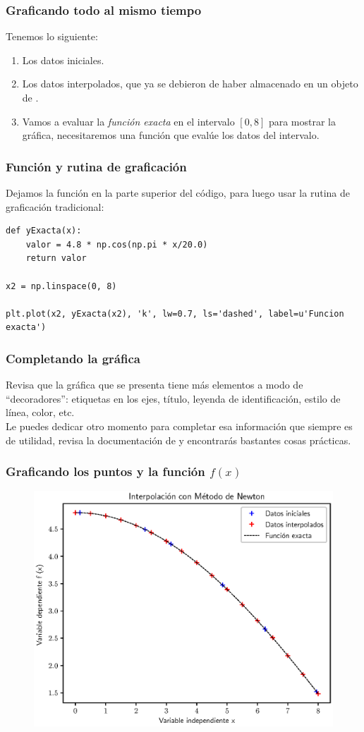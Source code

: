 \documentclass[12pt]{beamer}
\begin{document}
\begin{frame}
\frametitle{Graficando todo al mismo tiempo}
Tenemos lo siguiente:
\begin{enumerate}[<+->]
\item Los datos iniciales.
\item Los datos interpolados, que ya se debieron de haber almacenado en un objeto de \python.
\item Vamos a evaluar la \textit{función exacta} en el intervalo $[0, 8]$ para mostrar la gráfica, necesitaremos una función que evalúe los datos del intervalo.
\end{enumerate}
\end{frame}
\begin{frame}[fragile]
\frametitle{Función y rutina de graficación}
Dejamos la función en la parte superior del código, para luego usar la rutina de graficación tradicional:
\pause
\begin{lstlisting}[caption=Graficando la función exacta, style=FormattedNumber, basicstyle=\linespread{0.9}\ttfamily=\small, columns=fullflexible]
def yExacta(x):
    valor = 4.8 * np.cos(np.pi * x/20.0)
    return valor

x2 = np.linspace(0, 8)

plt.plot(x2, yExacta(x2), 'k', lw=0.7, ls='dashed', label=u'Funcion exacta')
\end{lstlisting}
\end{frame}
\begin{frame}
\frametitle{Completando la gráfica}
Revisa que la gráfica que se presenta tiene más elementos a modo de \enquote{decoradores}: \pause etiquetas en los ejes, título, leyenda de identificación, estilo de línea, color, etc.
\\
\bigskip
\pause
Le puedes dedicar otro momento para completar esa información que siempre es de utilidad, revisa la documentación de  y encontrarás bastantes cosas prácticas.
\end{frame}
\begin{frame}
\frametitle{Graficando los puntos y la función $f (x)$}
\begin{figure}
    \centering
    \includegraphics[scale=0.58]{Imagenes/Ejercicio_Newton_03.eps}
\end{figure}
\end{frame}
\end{document}
